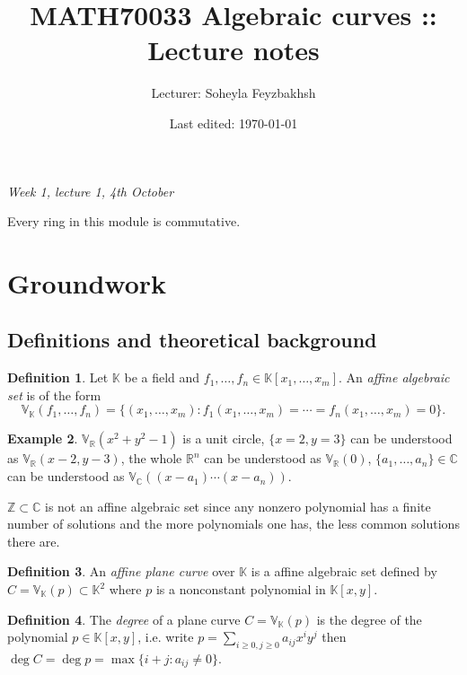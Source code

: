 \documentclass{article}
\title{MATH70033 Algebraic curves :: Lecture notes}
\author{Lecturer: Soheyla Feyzbakhsh}
\date{Last edited: \today}
\newcommand{\Z}{\mathbb{Z}}
\newcommand{\R}{\mathbb{R}}
\newcommand{\C}{\mathbb{C}}
\newcommand{\K}{\mathbb{K}}
\newcommand{\V}{\mathbb{V}}
\theoremstyle{definition}
\newtheorem{defn}{Definition}[subsection]
\newtheorem{example}[defn]{Example}
\begin{document}
\maketitle
\thispagestyle{empty}

\tableofcontents
\thispagestyle{empty}
\newpage
\setcounter{page}{1}

\begin{flushright}
\textit{Week 1, lecture 1, 4th October}
\end{flushright}

Every ring in this module is commutative.


\section{Groundwork}
\subsection{Definitions and theoretical background}
\begin{defn}
Let $\K$ be a field and $f_1,\ldots,f_n\in \K[x_1,\ldots,x_m]$. An \textit{affine algebraic set} is of the form
\[
\V_\K (f_1,\ldots,f_n)=\{(x_1,\ldots,x_m):f_1(x_1,\ldots,x_m)=\cdots=f_n(x_1,\ldots,x_m)=0\}.
\]
\end{defn}
\begin{example}
$\V_\R(x^2+y^2-1)$ is a unit circle, $\{x=2,y=3\}$ can be understood as $\V_\R(x-2,y-3)$, the whole $\R^n$ can be understood as $\V_\R(0)$, $\{a_1,\ldots,a_n\}\in\C$ can be understood as $\V_\C((x-a_1)\cdots (x-a_n))$.

$\Z\subset\C$ is not an affine algebraic set since any nonzero polynomial has a finite number of solutions and the more polynomials one has, the less common solutions there are.
\end{example}

\begin{defn}
An \textit{affine plane curve} over $\K$ is a affine algebraic set defined by $C=\V_\K (p)\subset\K^2$ where $p$ is a nonconstant polynomial in $\K[x,y]$.
\end{defn}
\begin{defn}
The \textit{degree} of a plane curve $C=\V_\K(p)$ is the degree of the polynomial $p\in\K[x,y]$, i.e. write $p=\sum_{i\geq 0,j\geq 0}a_{ij}x^iy^j$ then $\deg C=\deg p=\max\{i+j:a_{ij}\neq 0\}$.
\end{defn}
\end{document}
